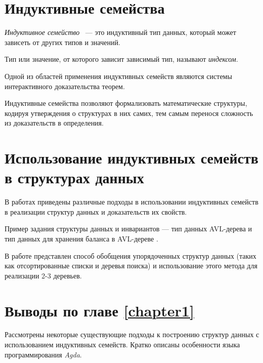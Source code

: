 % 

\section{Индуктивные семейства}

\begin{definition}
\emph{Индуктивное семейство} \cite{DybjerIndFam, RefiningIT}~— это индуктивный тип данных,
который может зависеть от других типов и значений.

Тип или значение, от которого зависит зависимый тип, называют \emph{индексом}.
\end{definition}

Одной из областей применения индуктивных семейств являются системы интерактивного
доказательства теорем.

Индуктивные семейства позволяют формализовать математические структуры,
кодируя утверждения о структурах в них самих,
тем самым перенося сложность из доказательств в определения.

\section{Использование индуктивных семейств в структурах данных}
В работах \cite{HongweiXi, McBridePivotal} приведены различные подходы
в использовании индуктивных семейств в реализации структур данных
и доказательств их свойств.

Пример задания структуры данных и инвариантов —
тип данных AVL-дерева и тип данных для хранения баланса в AVL-дереве \cite{AVLTree}.



В работе \cite{McBridePivotal} представлен способ обобщения
упорядоченных структур данных
(таких как отсортированные списки и деревья поиска)
и использование этого метода для реализации 2-3 деревьев.

\section{Выводы по главе \ref{chapter1}}

Рассмотрены некоторые существующие подходы к построению структур данных
с использованием индуктивных семейств.
Кратко описаны особенности языка программирования \textit{Agda}.
